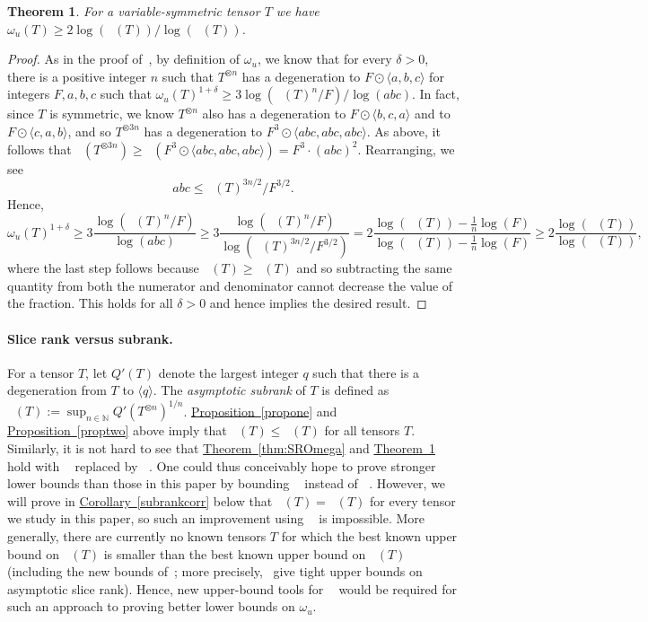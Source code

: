 \documentclass[11pt]{article}
\numberwithin{equation}{section}
\newtheorem{theorem}{Theorem}[section]
\theoremstyle{definition}
\theoremstyle{plain}
\newcommand{\N}{\mathbb N}
\newcommand{\expref}[2]{\hyperref[#2]{#1~\ref{#2}}}
\newcommand{\trr}{\mathop{\tilde{\operatorname{R}}}}
\newcommand{\tsr}{\mathop{\tilde{\operatorname{S}}}}
\newcommand{\tqr}{\mathop{\tilde{\operatorname{Q}}}}
\theoremstyle{definition}
\begin{document}
\begin{theorem}\label{thm:symmSOmega}
For a variable-symmetric tensor $T$ we have $\omega_u(T) \geq 2 \log (\trr(T)) / \log(\tsr(T)) $.
\end{theorem}

\begin{proof}
As in the proof of~\cite[Theorem~4.1]{aw}, by definition of $\omega_u$, we know that for every $\delta>0$, there is a positive integer $n$ such that $T^{\otimes n}$ has a degeneration to $F \odot \langle a,b,c \rangle$ for integers $F,a,b,c$ such that $\omega_u(T)^{1+\delta} \geq 3 \log(\trr(T)^n / F) / \log(abc)$. In fact, since $T$ is symmetric, we know $T^{\otimes n}$ also has a degeneration to $F \odot \langle b,c,a \rangle$ and to $F \odot \langle c,a,b \rangle$, and so $T^{\otimes 3n}$ has a degeneration to $F^3 \odot \langle abc, abc, abc \rangle$. As above, it follows that $\tsr(T^{\otimes 3n}) \geq \tsr(F^3 \odot \langle abc, abc, abc \rangle) = F^3 \cdot (abc)^2$. Rearranging, we see
$$abc \leq \tsr(T)^{3n/2} / F^{3/2}.$$
Hence,
$$\omega_u(T)^{1+\delta} \geq 3 \frac{\log(\trr(T)^n / F) }{ \log(abc)} \geq 3 \frac{\log(\trr(T)^n / F) }{ \log(\tsr(T)^{3n/2} / F^{3/2})} = 2 \frac{\log(\trr(T)) - \frac{1}{n} \log(F) }{ \log(\tsr(T)) - \frac{1}{n}\log(F)} \geq 2 \frac{\log(\trr(T)) }{ \log(\tsr(T)) },$$
where the last step follows because $\trr(T) \geq \tsr(T)$ and so subtracting the same quantity from both the numerator and denominator cannot decrease the value of the fraction. This holds for all $\delta>0$ and hence implies the desired result.
\end{proof}

%
\paragraph{Slice rank versus subrank.} For a tensor $T$, let $Q'(T)$ denote the largest integer $q$ such that there is a degeneration from $T$ to $\langle q \rangle$. The \emph{asymptotic subrank} of $T$ is defined as $\tqr(T) := \sup_{n \in \N} Q'(T^{\otimes n})^{1/n}$. \expref{Proposition}{propone} and \expref{Proposition}{proptwo} above imply that $\tqr(T) \leq \tsr(T)$ for all tensors $T$. Similarly, it is not hard to see that \expref{Theorem}{thm:SROmega} and \expref{Theorem}{thm:symmSOmega} hold with $\tsr$ replaced by $\tqr$. One could thus conceivably hope to prove stronger lower bounds than those in this paper by bounding $\tqr$ instead of $\tsr$. However, we will prove in \expref{Corollary}{subrankcorr} below that $\tqr(T) = \tsr(T)$ for every tensor we study in this paper, so such an improvement using $\tqr$ is impossible. More generally, there are currently no known tensors $T$ for which the best known upper bound on $\tqr(T)$ is smaller than the best known upper bound on $\tsr(T)$ (including the new bounds of~\cite{quantum,theirpreprint}; more precisely,~\cite{quantum} give tight upper bounds on asymptotic slice rank). Hence,
%
new  %
%
upper-bound tools for  %
$\tqr$ would be required for such an approach to proving better lower bounds on $\omega_u$.
\end{document}
